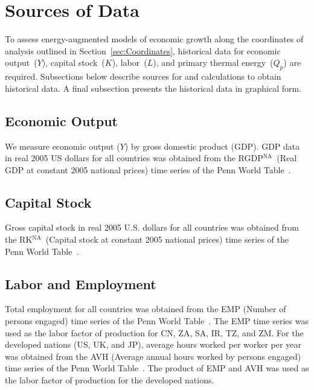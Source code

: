 \documentclass[preprint,authoryear,12pt]{elsarticle}\usepackage[]{graphicx}\usepackage[]{color}
\begin{document}
\section{Sources of Data}
\label{sec:Sources_of_Data}

To assess energy-augmented models of economic growth along the 
coordinates of analysis outlined in Section~\ref{sec:Coordinates}, 
historical data for 
economic output~($Y$), 
capital stock~($K$), 
labor~($L$), and 
primary thermal energy~($Q_p$)
are required. 
Subsections below describe sources for and calculations to obtain historical data. 
A final subsection presents the historical data in graphical form.

\subsection{Economic Output} 
\label{sec:Economic_Output_Data}

We measure economic output ($Y$) by gross domestic product (GDP). 
GDP data in real 2005 US dollars for all countries was obtained from the
RGDP$^{\mathrm{NA}}$~(Real GDP at constant 2005 national prices)
time series of the Penn World Table~\citep{Feenstra:2013aa}.

\subsection{Capital Stock}
\label{sec:Capital_Stock_Data}

Gross capital stock in real 2005 U.S. dollars 
for all countries was obtained from the
RK$^{\mathrm{NA}}$~(Capital stock at constant 2005 national prices)
time series of the Penn World Table~\citep{Feenstra:2013aa}.

\subsection{Labor and Employment}
\label{sec:Labor_Data}

Total employment for all countries
was obtained from the 
EMP (Number of persons engaged)
time series of the Penn World Table~\citep{Feenstra:2013aa}.
The EMP time series was used as the labor factor of production 
for CN, ZA, SA, IR, TZ, and ZM.
For the developed nations (US, UK, and JP), 
average hours worked per worker per year 
was obtained from the AVH (Average annual hours worked by persons engaged)
time series of the Penn World Table~\citep{Feenstra:2013aa}.
The product of EMP and AVH was used as the labor factor of production 
for the developed nations.
\end{document}
